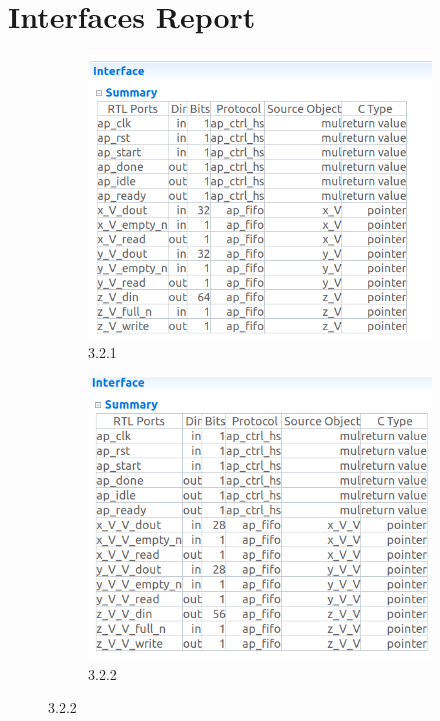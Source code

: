 \documentclass{article}
\begin{document}
\section{Interfaces Report}
\vspace{1cm}
\begin{figure}[h]
\centering
\begin{subfigure}[b]{0.6\textwidth}
    \centering
\includegraphics[width=\textwidth]{figs/33a.png}
    \caption{3.2.1}
    \label{fig:my_label}
\end{subfigure}
\hfill
\begin{subfigure}[b]{0.6\textwidth}
    \centering
\includegraphics[width=\textwidth]{figs/33b.png}
    \caption{3.2.2}
    \label{fig:my_label}
\end{subfigure}
\end{figure}
\vspace{15cm}
\end{document}
